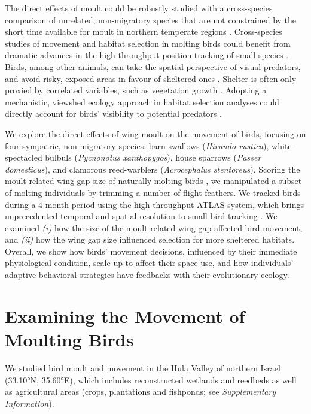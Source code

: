 The direct effects of moult could be robustly studied with a cross-species comparison of unrelated, non-migratory species that are not constrained by the short time available for moult in northern temperate regions \cite{ginn1983,jenni2020}.
Cross-species studies of movement and habitat selection in molting birds could benefit from dramatic advances in the high-throughput position tracking of small species \cite{toledo2020,nathan2022}.
Birds, among other animals, can take the spatial perspective of visual predators, and avoid risky, exposed areas in favour of sheltered ones \cite{hampton1994,emery2000,krams2001,davidson2016,krams2020}.
Shelter is often only proxied by correlated variables, such as vegetation growth \cite{pettorelli2011}. 
Adopting a mechanistic, viewshed ecology approach \cite{olsoy2015,aben2018,aben2021} in habitat selection analyses could directly account for birds' visibility to potential predators \cite{olsoy2015,aben2018,aben2021}.

We explore the direct effects of wing moult on the movement of birds, focusing on four sympatric, non-migratory species: barn swallows (\textit{Hirundo rustica}), white-spectacled bulbuls (\textit{Pycnonotus xanthopygos}), house sparrows (\textit{Passer domesticus}), and clamorous reed-warblers (\textit{Acrocephalus stentoreus}).
Scoring the moult-related wing gap size of naturally molting birds \citep{lind2001,kiat2016}, we manipulated a subset of molting individuals by trimming a number of flight feathers.
We tracked birds during a 4-month period using the high-throughput ATLAS system, which brings unprecedented temporal and spatial resolution to small bird tracking \citep{toledo2014,weiser2016,toledo2020,nathan2022,beardsworth2022mee}.
We examined \textit{(i)} how the size of the moult-related wing gap affected bird movement, and \textit{(ii)} how the wing gap size influenced selection for more sheltered habitats.
Overall, we show how birds' movement decisions, influenced by their immediate physiological condition, scale up to affect their space use, and how individuals' adaptive behavioral strategies have feedbacks with their evolutionary ecology.

\section*{Examining the Movement of Moulting Birds}

We studied bird moult and movement in the Hula Valley of northern Israel (33.10°N, 35.60°E), which includes reconstructed wetlands and reedbeds as well as agricultural areas (crops, plantations and fishponds; see \textit{Supplementary Information}).

